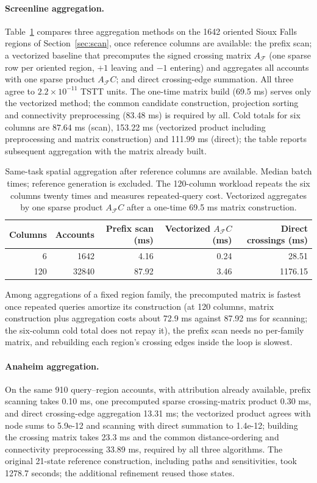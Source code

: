 \paragraph{Screenline aggregation.}
Table~\ref{tab:scan} compares three aggregation methods on the 1642
oriented Sioux Falls regions of Section~\ref{sec:scan}, once reference
columns are available: the prefix scan; a vectorized baseline that
precomputes the signed crossing matrix $A_{\mathcal F}$ (one sparse row
per oriented region, $+1$ leaving and $-1$ entering) and aggregates
all accounts with one sparse product $A_{\mathcal F}C$; and direct
crossing-edge summation. All three agree to $2.2\times10^{-11}$ TSTT
units. The one-time matrix build (69.5 ms) serves only the vectorized
method; the common candidate construction, projection sorting and
connectivity preprocessing (83.48 ms) is required by all. Cold totals
for six columns are 87.64 ms (scan), 153.22 ms (vectorized product
including preprocessing and matrix construction) and 111.99 ms
(direct); the table reports subsequent aggregation with the matrix
already built.
\begin{table}[pos=t]\centering\footnotesize\caption{Same-task spatial aggregation after reference columns are available. Median batch times; reference generation is excluded. The 120-column workload repeats the six columns twenty times and measures repeated-query cost. Vectorized aggregates by one sparse product $A_{\mathcal F}C$ after a one-time 69.5 ms matrix construction.}\label{tab:scan}\begin{tabular}{rrrrr}\toprule Columns & Accounts & Prefix scan (ms) & Vectorized $A_{\mathcal F}C$ (ms) & Direct crossings (ms)\\\midrule
6 & 1642 & 4.16 & 0.24 & 28.51\\
120 & 32840 & 87.92 & 3.46 & 1176.15\\
\bottomrule\end{tabular}\end{table}
Among aggregations of a fixed region family, the precomputed matrix is
fastest once repeated queries amortize its construction (at 120
columns, matrix construction plus aggregation costs about 72.9 ms
against 87.92 ms for scanning; the six-column cold total does not
repay it), the prefix scan needs no per-family matrix, and rebuilding
each region's crossing edges inside the loop is slowest.

\paragraph{Anaheim aggregation.}
On the same 910 query--region accounts, with attribution already
available, prefix scanning takes 0.10 ms, one precomputed sparse
crossing-matrix product 0.30 ms, and direct crossing-edge aggregation
13.31 ms; the vectorized product agrees with node sums to 5.9e-12 and
scanning with direct summation to 1.4e-12; building the crossing
matrix takes 23.3 ms and the common distance-ordering and connectivity
preprocessing 33.89 ms, required by all three algorithms. The original
21-state reference construction, including paths and sensitivities,
took 1278.7 seconds; the additional refinement reused those states.







